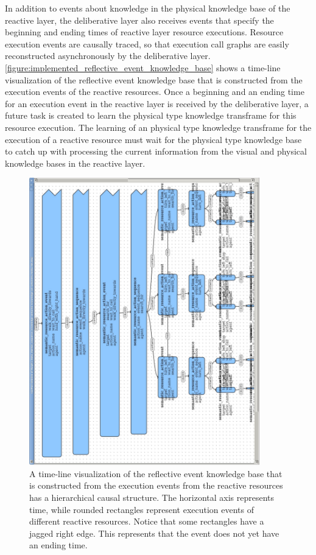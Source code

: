 In addition to events about knowledge in the physical knowledge base
of the reactive layer, the deliberative layer also receives events
that specify the beginning and ending times of reactive layer resource
executions.  Resource execution events are causally traced, so that
execution call graphs are easily reconstructed asynchronously by the
deliberative layer.
{\mbox{\autoref{figure:implemented_reflective_event_knowledge_base}}}
shows a time-line visualization of the reflective event knowledge base
that is constructed from the execution events of the reactive
resources.  Once a beginning and an ending time for an execution event
in the reactive layer is received by the deliberative layer, a future
task is created to learn the physical type knowledge transframe for
this resource execution.  The learning of an physical type knowledge
transframe for the execution of a reactive resource must wait for the
physical type knowledge base to catch up with processing the current
information from the visual and physical knowledge bases in the
reactive layer.
\begin{figure}
\begin{center}
\includegraphics[width=10cm]{gfx/implemented_reflective_event_knowledge_base}
\end{center}
\caption[A time-line visualization of the reflective event knowledge
  base that is constructed from the execution events from the reactive
  resources.]{A time-line visualization of the reflective event
  knowledge base that is constructed from the execution events from
  the reactive resources has a hierarchical causal structure.  The
  horizontal axis represents time, while rounded rectangles represent
  execution events of different reactive resources.  Notice that some
  rectangles have a jagged right edge.  This represents that the event
  does not yet have an ending time.}
\label{figure:physical_type_knowledge_abstraction}
\end{figure}


